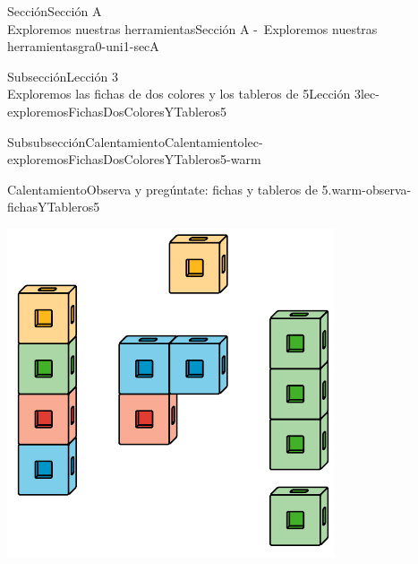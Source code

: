 \begin{sectionptx}{Sección}{{\Large Sección A\\}Exploremos nuestras herramientas}{}{Sección A -~Exploremos nuestras herramientas}{}{}{gra0-uni1-secA}
\begin{subsectionptx}{Subsección}{{\normalsize Lección 3\\[-0.05cm]}Exploremos las fichas de dos colores y los tableros de 5}{}{Lección 3}{}{}{lec-exploremosFichasDosColoresYTableros5}
\begin{subsubsectionptx}{Subsubsección}{Calentamiento}{}{Calentamiento}{}{}{lec-exploremosFichasDosColoresYTableros5-warm}
\begin{exploration}{Calentamiento}{Observa y pregúntate: fichas y tableros de 5.}{warm-observa-fichasYTableros5}
\begin{sidebyside}{2}{0.05}{0.05}{0.1}
\begin{sbspanel}{0.4}
\includegraphics[max width=\linewidth, center]{external/svg-source/tikz-file-128850.pdf}
\end{sbspanel}%
\begin{sbspanel}{0.4}%

\end{sbspanel}
\end{sidebyside}
\end{exploration}
\end{subsubsectionptx}
\end{subsectionptx}
\end{sectionptx}
